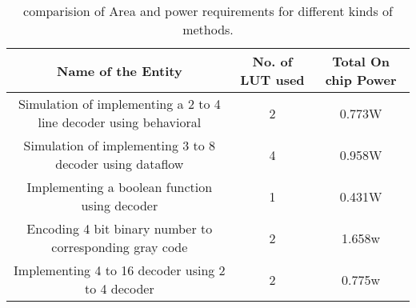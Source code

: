 \begin{table}[h!]
\centering
\begin{tabular}{|c|c|c|}
\hline
\textbf{Name of the Entity} & \textbf{No. of LUT used} & \textbf{Total On chip Power}\\
\hline
Simulation of implementing a 2 to 4 line decoder using behavioral & 2 & 0.773W \\ \hline


Simulation of implementing 3 to 8 decoder using dataflow & 4 & 0.958W \\ \hline


Implementing a boolean function using decoder & 1 & 0.431W \\ \hline

Encoding 4 bit binary number to corresponding gray code & 2 & 1.658w \\ \hline

Implementing 4 to 16 decoder using 2 to 4 decoder & 2 & 0.775w \\ \hline



\end{tabular}
\caption{comparision of Area and power requirements for different kinds of methods.}
\label{tab:}
\end{table}







